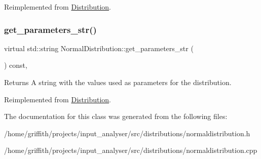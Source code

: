 Reimplemented from \hyperlink{classDistribution_a478a0c7b72d3ad266a2b6f1b9ed20fe9}{Distribution}.

\mbox{\label{classNormalDistribution_acedea04da0d96d01ed5c7fde83a56e1c}} 
\subsubsection{\texorpdfstring{get\+\_\+parameters\+\_\+str()}{get\_parameters\_str()}}
{\footnotesize\ttfamily virtual std\+::string Normal\+Distribution\+::get\+\_\+parameters\+\_\+str (\begin{DoxyParamCaption}{ }\end{DoxyParamCaption}) const\hspace{0.3cm}{\ttfamily [inline]}, {\ttfamily [virtual]}}

\begin{DoxyReturn}{Returns}
A string with the values used as parameters for the distribution. 
\end{DoxyReturn}


Reimplemented from \hyperlink{classDistribution_a716b7df9facb6bb016f46ac130297f9c}{Distribution}.



The documentation for this class was generated from the following files\+:\begin{DoxyCompactItemize}
\item 
/home/griffith/projects/input\+\_\+analyser/src/distributions/normaldistribution.\+h\item 
/home/griffith/projects/input\+\_\+analyser/src/distributions/normaldistribution.\+cpp\end{DoxyCompactItemize}
